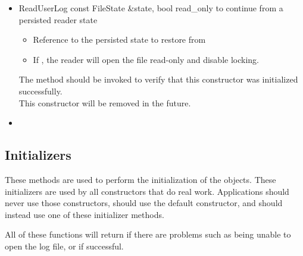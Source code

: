 \begin{itemize}
\item \Constructor
  {ReadUserLog}
  {const FileState \&state, bool read\_only}
  {to continue from a persisted reader state}
  \begin{itemize}
  \item {}
    Reference to the persisted state to restore from
  \item {}
    If , the reader will open the file read-only and
    disable locking.
  \end{itemize}
  \Note The 
  method should be invoked to verify that this constructor was
  initialized successfully.
  \\ \Note This constructor will be removed in the future.

\item {}

\end{itemize}


\subsection{Initializers}

These methods are used to perform the initialization of the
 objects.  These initializers are used by all constructors
that do real work.  
Applications should never use those constructors,
should use the default constructor,
 and should instead use one of these initializer methods.

All of these functions will return  if there are problems
such as being unable to open the log file,
or  if successful.

